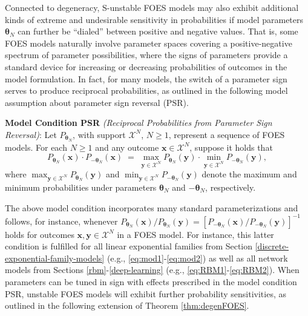 \documentclass[]{article}
\theoremstyle{definition}
\begin{document}
Connected to degeneracy, S-unstable FOES models may also exhibit
additional kinds of extreme and undesirable sensitivity in probabilities
if model parameters \(\boldsymbol \theta_N\) can further be ``dialed''
between positive and negative values. That is, some FOES models
naturally involve parameter spaces covering a positive-negative spectrum
of parameter possibilities, where the signs of parameters provide a
standard device for increasing or decreasing probabilities of outcomes
in the model formulation. In fact, for many models, the switch of a
parameter sign serves to produce reciprocal probabilities, as outlined
in the following model assumption about parameter sign reversal (PSR).

\textbf{Model Condition PSR} \emph{(Reciprocal Probabilities from
Parameter Sign Reversal)}: Let \(P_{\boldsymbol \theta_N}\), with
support \(\mathcal{X}^N\), \(N\geq 1\), represent a sequence of FOES
models. For each \(N \geq 1\) and any outcome
\(\boldsymbol x \in \mathcal{X}^N\), suppose it holds that \[
P_{\boldsymbol \theta_N}(\boldsymbol x)  \cdot P_{-\boldsymbol \theta_N}(\boldsymbol x) \;=\;   \max\limits_{\boldsymbol y \in \mathcal{X}^N}P_{ \boldsymbol \theta_N}(\boldsymbol y)\cdot \min\limits_{\boldsymbol y \in \mathcal{X}^N}P_{-\boldsymbol \theta_N}(\boldsymbol y),
\] where
\(\max_{\boldsymbol y \in \mathcal{X}^N}P_{ \boldsymbol \theta_N}(\boldsymbol y)\)
and
\(\min_{\boldsymbol y \in \mathcal{X}^N}P_{-\boldsymbol \theta_N}(\boldsymbol y)\)
denote the maximum and minimum probabilities under parameters
\(\boldsymbol \theta_N\) and \(-\boldsymbol \theta_N\), respectively.

The above model condition incorporates many standard parameterizations
and follows, for instance, whenever
\(P_{\boldsymbol \theta_N}(\boldsymbol x)/P_{\boldsymbol \theta_N}(\boldsymbol y) = [P_{-\boldsymbol \theta_N}(\boldsymbol x)/P_{-\boldsymbol \theta_N}(\boldsymbol y)]^{-1}\)
holds for outcomes \(\boldsymbol x, \boldsymbol y \in\mathcal{X}^N\) in
a FOES model. For instance, this latter condition is fulfilled for all
linear exponential families from Section
\ref{discrete-exponential-family-models} (e.g.,
\eqref{eq:mod1}-\eqref{eq:mod2}) as well as all network models from Sections
\ref{rbm}-\ref{deep-learning} (e.g., \eqref{eq:RBM1}-\eqref{eq:RBM2}). When
parameters can be tuned in sign with effects prescribed in the model
condition PSR, unstable FOES models will exhibit further probability
sensitivities, as outlined in the following extension of Theorem
\ref{thm:degenFOES}.
\end{document}
